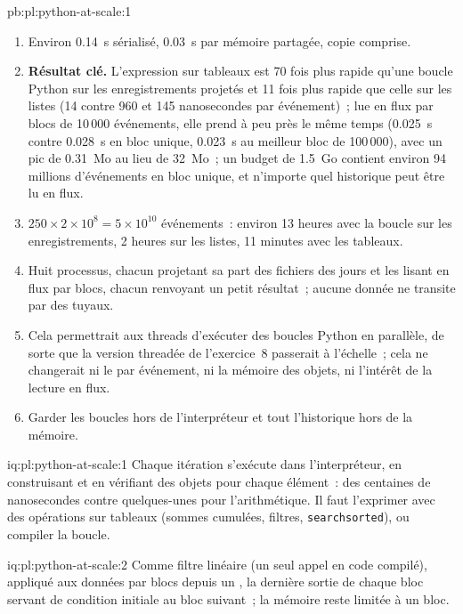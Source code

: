 \begin{solution}{pb:pl:python-at-scale:1}
\begin{enumerate}
\item Environ 0.14~s sérialisé, 0.03~s par mémoire partagée, copie comprise.
\item \textbf{Résultat clé.} L'expression sur tableaux est 70 fois plus rapide qu'une boucle Python sur les enregistrements projetés et 11 fois plus rapide
que celle sur les listes (14 contre 960 et 145 nanosecondes par événement)~; lue en flux par blocs de 10\,000 événements, elle prend à peu près le même temps
(0.025~s contre 0.028~s en bloc unique, 0.023~s au meilleur bloc de 100\,000), avec un pic de 0.31~Mo au lieu de 32~Mo~; un budget de 1.5~Go contient environ 94 millions d'événements en bloc unique, et n'importe quel historique peut être lu en flux.
\item $250 \times 2\times10^8 = 5\times10^{10}$ événements~: environ 13 heures avec la boucle sur les enregistrements, 2 heures sur les listes, 11 minutes avec
les tableaux.
\item Huit processus, chacun projetant sa part des fichiers des jours et les lisant en flux par blocs, chacun renvoyant un petit résultat~; aucune donnée
ne transite par des tuyaux.
\item Cela permettrait aux threads d'exécuter des boucles Python en parallèle, de sorte que la version threadée de l'exercice~8 passerait à l'échelle~; cela ne
changerait ni le  par événement, ni la mémoire des objets, ni l'intérêt de la lecture en flux.
\item Garder les boucles hors de l'interpréteur et tout l'historique hors de la mémoire.
\end{enumerate}
\end{solution}

\begin{solution}{iq:pl:python-at-scale:1}
Chaque itération s'exécute dans l'interpréteur, en construisant et en vérifiant des objets pour chaque élément~: des centaines de nanosecondes contre quelques-unes
pour l'arithmétique. Il faut l'exprimer avec des opérations sur tableaux (sommes cumulées, filtres, \texttt{searchsorted}), ou compiler la boucle.
\end{solution}

\begin{solution}{iq:pl:python-at-scale:2}
Comme filtre linéaire (un seul appel en code compilé), appliqué aux données par blocs depuis un , la dernière sortie de chaque
bloc servant de condition initiale au bloc suivant~; la mémoire reste limitée à un bloc.
\end{solution}

